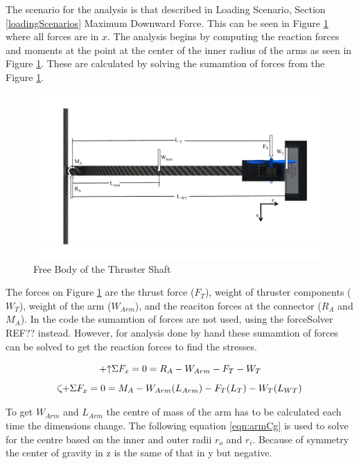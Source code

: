 \documentclass[../main.tex]{subfiles}
\begin{document}
The scenario for the analysis is that described in Loading Scenario, Section \ref{loadingScenarios} Maximum Downward Force. This can be seen in Figure \ref{fig:thrusterArmFBD} where all forces are in $x$. The analysis begins by computing the reaction forces and moments at the point at the center of the inner radius of the arms as seen in Figure \ref{fig:thrusterArmFBD}. These are calculated by solving the sumamtion of forces from the Figure \ref{fig:thrusterArmFBD}.

\begin{figure}[H]
	\centering
	\includegraphics[width=.9\linewidth]{img/analysis/arm/thrusterArm.pdf}
	\caption{Free Body of the Thruster Shaft}
	\label{fig:thrusterArmFBD}
\end{figure}

The forces on Figure \ref{fig:thrusterArmFBD} are the thrust force ($F_T$), weight of thruster components ($W_T$), weight of the arm ($W_{Arm}$), and the reaciton forces at the connector ($R_A$ and $M_A$). In the code the sumamtion of forces are not used, using the forceSolver REF?? instead. However, for analysis done by hand these sumamtion of forces can be solved to get the reaction forces to find the stresses.

\begin{equation} \label{eqn:armFx}
\mathbin{+\mathord\uparrow} \Sigma F_x = 0 = R_A - W_{Arm} - F_T - W_T
\end{equation}
\begin{equation} \label{eqn:armMA}
\curveplus \Sigma F_x = 0 = M_A - W_{Arm}(L_{Arm}) - F_T(L_T) - W_T(L_{WT})
\end{equation}

To get $W_{Arm}$ and $L_{Arm}$ the centre of mass of the arm has to be calculated each time the dimensions change. The following equation \ref{eqn:armCg} is used to solve for the centre based on the inner and outer radii $r_o$ and $r_i$. Because of symmetry the center of gravity in z is the same of that in y but negative. 
\end{document}
